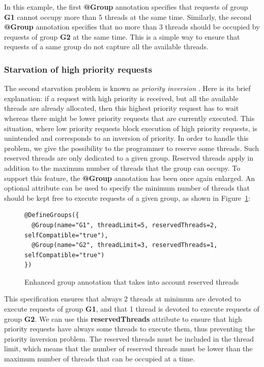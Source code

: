 \documentclass[11pt]{report}
\begin{document}
In this example, the first \textbf{@Group} annotation specifies that requests of group \textbf{G1} cannot occupy more than 5 threads at the same time. Similarly, the second \textbf{@Group} annotation specifies that no more than 3 threads should be occupied by requests of group \textbf{G2} at the same time.
This is a simple way to ensure that requests of a same group do not capture all the available threads.

\subsubsection{Starvation of high priority requests}
The second starvation problem is known as \emph{priority inversion} \cite{Lampson:1980:EPM:358818.358824}. Here is its brief explanation: if a request with high priority is received, but all the available threads are already allocated, then this highest priority request has to wait whereas there might be lower priority requests that are currently executed. This situation, where low priority requests block execution of high priority requests, is unintended and corresponds to an inversion of priority. In order to handle this problem, we give the possibility to the programmer to reserve some threads. Such reserved threads are only dedicated to a given group. Reserved threads apply in addition to the maximum number of threads that the group can occupy. To support this feature, the \textbf{@Group} annotation has been once again enlarged. An optional attribute can be used to specify the minimum number of threads that should be kept free to execute requests of a given group, as shown in Figure~\ref{fig:new_new_groups}:

\begin{figure}[!ht]
	\lstset{language=java, numbers=left, numberstyle=\tiny, stepnumber=1, numbersep=5pt, basicstyle=\footnotesize}
	\begin{lstlisting}[frame=single]
@DefineGroups({
  @Group(name="G1", threadLimit=5, reservedThreads=2, selfCompatible="true"),
  @Group(name="G2", threadLimit=3, reservedThreads=1, selfCompatible="true")
})
 	\end{lstlisting}
\caption{Enhanced group annotation that takes into account reserved threads}
\label{fig:new_new_groups}
\end{figure}

This specification ensures that always 2 threads at minimum are devoted to execute requests of group \textbf{G1}, and that 1 thread is devoted to execute requests of group \textbf{G2}. We can use this \textbf{reservedThreads} attribute to ensure that high priority requests have always some threads to execute them, thus preventing the priority inversion problem.
The reserved threads must be included in the thread limit, which means that the number of reserved threads must be lower than the maximum number of threads that can be occupied at a time.
\end{document}
